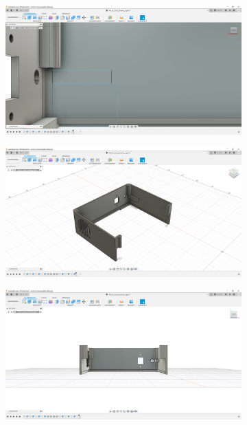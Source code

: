 \begin{figure}[h!tb]
\begin{subfigure}[t]{.3\linewidth}
		\caption[]{}
		\label{fig:design-right-12}
	\end{subfigure}
	\begin{subfigure}[t]{.3\linewidth}
		\includegraphics[width=\linewidth]{img/konstruktion_gehaeuse_rechts_013.png}
		\caption[]{}
		\label{fig:design-right-13}
	\end{subfigure}
	\begin{subfigure}[t]{.3\linewidth}
		\includegraphics[width=\linewidth]{img/konstruktion_gehaeuse_rechts_014.png}
		\caption[]{}
		\label{fig:design-right-14}
	\end{subfigure}
	\begin{subfigure}[t]{.3\linewidth}
		\includegraphics[width=\linewidth]{img/konstruktion_gehaeuse_rechts_015.png}

\end{subfigure}
\end{figure}
